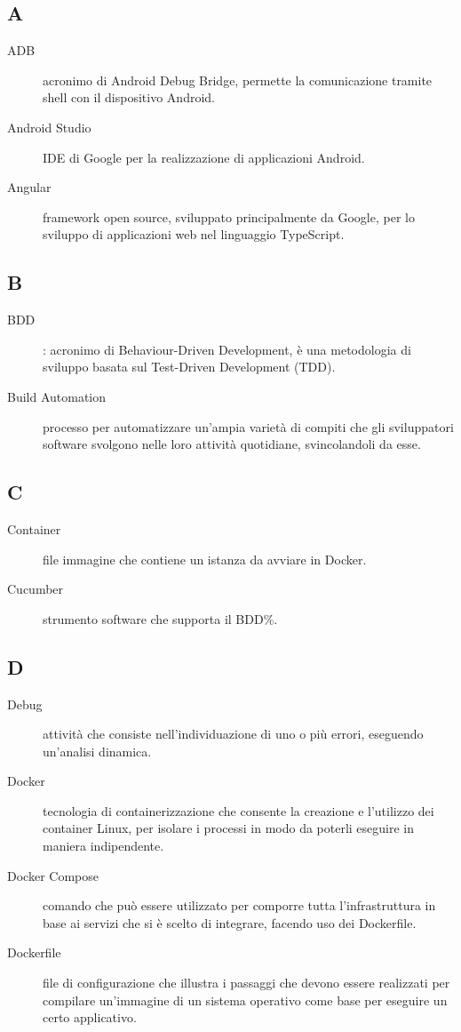 \documentclass[../../../manuale.sviluppatore.tex]{subfiles}
\begin{document}
\subsection{A}

\begin{description}
    \item[ADB] acronimo di Android Debug Bridge, permette la comunicazione tramite shell con il dispositivo Android.
    \item[Android Studio] IDE di Google per la realizzazione di applicazioni Android.
    \item[Angular] framework open source, sviluppato principalmente da Google, per lo sviluppo di applicazioni web nel linguaggio TypeScript.
\end{description}

\subsection{B}
\begin{description}
    \item[BDD]: acronimo di Behaviour-Driven Development, è una metodologia di sviluppo basata sul Test-Driven Development (TDD).
    \item[Build Automation] processo per automatizzare un'ampia varietà di compiti che gli sviluppatori software svolgono nelle loro attività quotidiane, svincolandoli da esse.
\end{description}

\subsection{C}

\begin{description}
    \item[Container] file immagine che contiene un istanza da avviare in Docker.
    \item[Cucumber] strumento software che supporta il BDD\%.
\end{description}

\subsection{D}

\begin{description}
    \item[Debug] attività che consiste nell'individuazione di uno o più errori, eseguendo un'analisi dinamica.
    \item[Docker] tecnologia di containerizzazione che consente la creazione e l'utilizzo dei container Linux, per isolare i processi in modo da poterli eseguire in maniera indipendente.
    \item[Docker Compose] comando che può essere utilizzato per comporre tutta l’infrastruttura in base ai servizi che si è scelto di integrare, facendo uso dei Dockerfile.
    \item[Dockerfile] file di configurazione che illustra i passaggi che devono essere realizzati per compilare un’immagine di un sistema operativo come base per eseguire un certo applicativo. 
\end{description}
\end{document}
